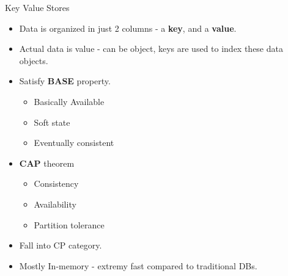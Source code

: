 \documentclass{beamer}
\begin{document}
\begin{frame}{Key Value Stores}
    \begin{itemize}
        \item Data is organized in just 2 columns - a \textbf{key}, and a \textbf{value}.
        \pause
        \item Actual data is value - can be object, keys are used to index these data objects.
        \pause
        \item Satisfy \textbf{BASE} property.
            \pause
            \begin{itemize}
                \item Basically Available
                \pause
                \item Soft state
                \pause
                \item Eventually consistent
            \end{itemize}
        \pause
        \item \textbf{CAP} theorem
            \begin{itemize}
                \pause
                \item Consistency
                \pause
                \item Availability
                \pause
                \item Partition tolerance
            \end{itemize}
       \pause
        \item Fall into CP category.
        \pause
        \item Mostly In-memory - extremy fast compared to traditional DBs.
    \end{itemize}
\end{frame}
\end{document}
